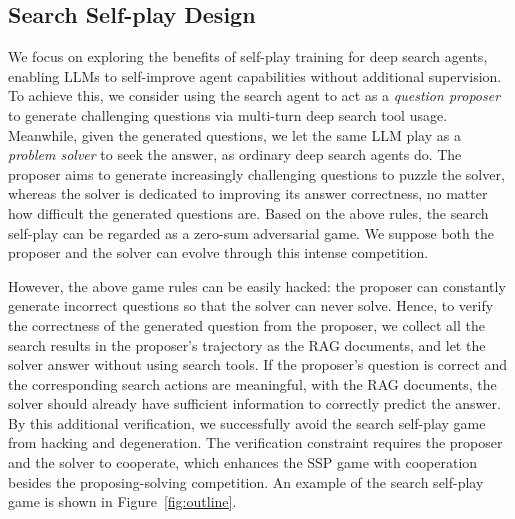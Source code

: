 \documentclass[10pt, a4paper, logo]{googledeepmind} %
\begin{document}
\subsection{Search Self-play Design}

 We focus on exploring the benefits of self-play training for deep search agents, enabling LLMs to self-improve agent capabilities without additional supervision. To achieve this, we consider using the search agent to act as a \textit{question proposer}  to generate challenging questions via multi-turn deep search tool usage. Meanwhile, given the generated questions, we let the same LLM play as a \textit{problem solver}  to seek the answer, as ordinary deep search agents do. The proposer aims to generate increasingly challenging questions to puzzle the solver, whereas the solver is dedicated to improving its answer correctness, no matter how difficult the generated questions are. Based on the above rules, the search self-play can be regarded as a zero-sum adversarial game. We suppose both the proposer and the solver can evolve through this intense competition.
 
 However, the above game rules can be easily hacked: the proposer can constantly generate incorrect questions so that the solver can never solve.
 Hence, to verify the correctness of the generated question from the proposer, we collect all the search results in the proposer's trajectory as the RAG documents, and let the solver answer without using search tools. If the proposer's question is correct and the corresponding search actions are meaningful, with the RAG documents, the solver should already have sufficient information to correctly predict the answer. By this additional verification, we successfully avoid the search self-play game from hacking and degeneration. The verification constraint requires the proposer and the solver to cooperate, which enhances the SSP game with cooperation besides the proposing-solving competition. An example of the search self-play game is shown in Figure~\ref{fig:outline}.

\end{document}
